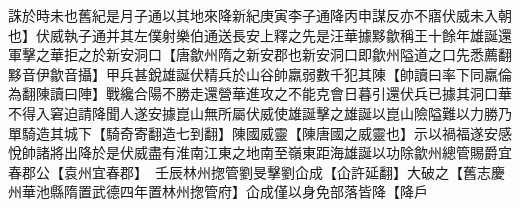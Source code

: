 誅於時未也舊紀是月子通以其地來降新紀庚寅李子通降丙申謀反亦不寤伏威未入朝也】伏威執子通并其左僕射樂伯通送長安上釋之先是汪華據黟歙稱王十餘年雄誕還軍擊之華拒之於新安洞口【唐歙州隋之新安郡也新安洞口即歙州隘道之口先悉薦翻黟音伊歙音攝】甲兵甚銳雄誕伏精兵於山谷帥羸弱數千犯其陳【帥讀曰率下同羸倫為翻陳讀曰陣】戰纔合陽不勝走還營華進攻之不能克會日暮引還伏兵已據其洞口華不得入窘迫請降聞人遂安據崑山無所屬伏威使雄誕擊之雄誕以崑山險隘難以力勝乃單騎造其城下【騎奇寄翻造七到翻】陳國威靈【陳唐國之威靈也】示以禍福遂安感悅帥諸將出降於是伏威盡有淮南江東之地南至嶺東距海雄誕以功除歙州總管賜爵宜春郡公【袁州宜春郡】　壬辰林州揔管劉旻擊劉仚成【仚許延翻】大破之【舊志慶州華池縣隋置武德四年置林州揔管府】仚成僅以身免部落皆降【降戶